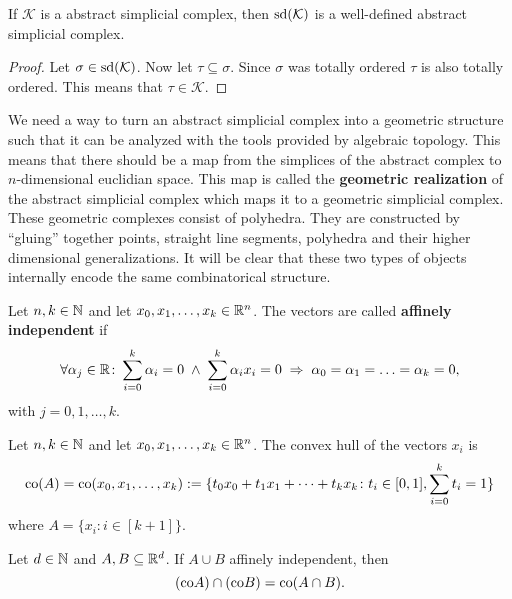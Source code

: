 \begin{thm}
    If $\mathcal{K}$ is a abstract simplicial complex, then ${\rm sd}(\mathcal{K})$ is a well-defined abstract simplicial complex.
\end{thm}

\begin{proof}
    Let $\sigma \in {\rm sd}(\mathcal{K})$. Now let $\tau \subseteq \sigma$. Since $\sigma$ was totally ordered $\tau$ is also totally ordered.
    This means that $\tau \in \mathcal{K}$.
\end{proof}

We need a way to turn an abstract simplicial complex into a geometric structure such that it can be analyzed with the tools provided by algebraic topology. This means that there should be a map from the simplices of the abstract complex to $n$-dimensional euclidian space. This map is called the \textbf{geometric realization} of the abstract simplicial complex which maps it to a geometric simplicial complex. 
These geometric complexes consist of polyhedra. They are constructed by ``gluing'' 
together points, straight line segments, polyhedra and their higher dimensional generalizations.
It will be clear that these two types of objects internally encode the same combinatorical structure. 

\begin{defin}
    Let $n,k \in \mathbb{N}$ and let $x_0, x_1, \ldots, x_k \in \mathbb{R}^n$. 
    The vectors are called \textbf{affinely independent} if
    \begin{equation*}
        \forall \alpha_j\in \mathbb{R}\colon \sum\limits_{i=0}^k \alpha_i = 0 \; \land \; \sum\limits_{i=0}^k \alpha_i x_i = 0 \; \Rightarrow \; \alpha_0 = \alpha_1 = \ldots = \alpha_k = 0, 
    \end{equation*} with $j = 0, 1, \ldots, k$.
\end{defin}

\begin{defin}
    Let $n,k \in \mathbb{N}$ and let $x_0, x_1, \ldots, x_k \in \mathbb{R}^n$. The convex hull of the vectors $x_i$ is
    \begin{equation*}
        {\rm co} (A) = {\rm co}(x_0, x_1, \ldots, x_k) := \{ t_0 x_0 + t_1 x_1 + \cdots + t_k x_k \colon t_i \in [0, 1], \sum\limits_{i=0}^k t_i = 1\}
    \end{equation*}
    where $A = \{x_i\colon i \in [k+1]\}$.  
\end{defin}

\begin{rem}
  Let $d\in\mathbb{N}$ and $A,B \subseteq \mathbb{R}^d$. If $A \cup B$ affinely independent, then
  \begin{equation*}
    ({\rm co} A) \cap ({\rm co}B) = {\rm co}(A \cap B).
  \end{equation*}
\end{rem}

